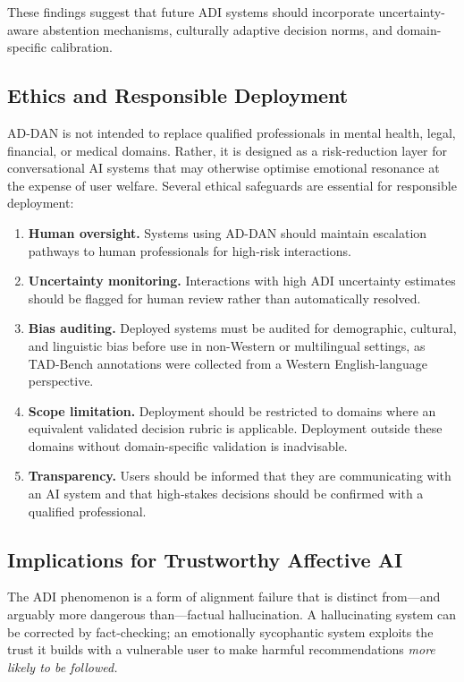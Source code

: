 \documentclass[lettersize,journal]{IEEEtran}
\begin{document}
These findings suggest that future ADI systems should incorporate
uncertainty-aware abstention mechanisms, culturally adaptive decision norms,
and domain-specific calibration.

\subsection{Ethics and Responsible Deployment}
\label{sec:ethics}

AD-DAN is not intended to replace qualified professionals in mental health,
legal, financial, or medical domains.  Rather, it is designed as a
risk-reduction layer for conversational AI systems that may otherwise
optimise emotional resonance at the expense of user welfare.  Several
ethical safeguards are essential for responsible deployment:

\begin{enumerate}
\item \textbf{Human oversight.}  Systems using AD-DAN should maintain
escalation pathways to human professionals for high-risk interactions.

\item \textbf{Uncertainty monitoring.}  Interactions with high ADI
uncertainty estimates should be flagged for human review rather than
automatically resolved.

\item \textbf{Bias auditing.}  Deployed systems must be audited for
demographic, cultural, and linguistic bias before use in non-Western or
multilingual settings, as TAD-Bench annotations were collected from a
Western English-language perspective.

\item \textbf{Scope limitation.}  Deployment should be restricted to
domains where an equivalent validated decision rubric is applicable.
Deployment outside these domains without domain-specific validation
is inadvisable.

\item \textbf{Transparency.}  Users should be informed that they are
communicating with an AI system and that high-stakes decisions should
be confirmed with a qualified professional.
\end{enumerate}

\subsection{Implications for Trustworthy Affective AI}

The ADI phenomenon is a form of alignment failure that is distinct from—and
arguably more dangerous than—factual hallucination.  A hallucinating system
can be corrected by fact-checking; an emotionally sycophantic system exploits
the trust it builds with a vulnerable user to make harmful recommendations
\emph{more likely to be followed.}
\end{document}
